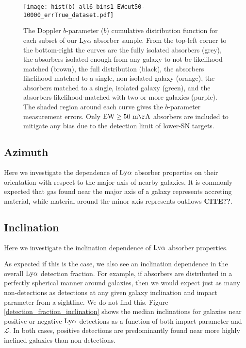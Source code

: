 \documentclass[twocolumn,tighten]{aastex62}
\begin{document}
\begin{figure}[ht!]
        \centering
        \vspace{0pt}
        \texttt{[image: hist(b)\_all6\_bins1\_EWcut50-10000\_errTrue\_dataset.pdf]}
        \caption{\small{The Doppler $b$-parameter ($b$) cumulative distribution function for each subset of our Ly$\alpha$ absorber sample. From the top-left corner to the bottom-right the curves are the fully isolated absorbers (grey), the absorbers isolated enough from any galaxy to not be likelihood-matched (brown), the full distribution (black), the absorbers likelihood-matched to a single, non-isolated galaxy (orange), the absorbers matched to a single, isolated galaxy (green), and the absorbers likelihood-matched with two or more galaxies (purple). The shaded region around each curve gives the $b$-parameter measurement errors. Only $\rm EW \ge 50~m\AA$ absorbers are included to mitigate any bias due to the detection limit of lower-SN targets.}}
        \vspace{5pt}
        \label{cdf_b}
\end{figure}



\subsection{Azimuth}
Here we investigate the dependence of $\rm Ly\alpha$ absorber properties on their orientation with respect to the major axis of nearby galaxies. It is commonly expected that gas found near the major axis of a galaxy represents accreting material, while material around the minor axis represents outflows \textbf{CITE??}. 



\subsection{Inclination}

Here we investigate the inclination dependence of $\rm Ly\alpha$ absorber properties.

As expected if this is the case, we also see an inclination dependence in the overall $\rm Ly\alpha$ detection fraction. For example, if absorbers are distributed in a perfectly spherical manner around galaxies, then we would expect just as many non-detections as detections at any given galaxy inclination and impact parameter from a sightline. We do not find this. Figure \ref{detection_fraction_inclination} shows the median inclinations for galaxies near positive or negative $\rm Ly\alpha$ detections as a function of both impact parameter and $\mathcal{L}$. In both cases, positive detections are predominantly found near more highly inclined galaxies than non-detections.
\end{document}

